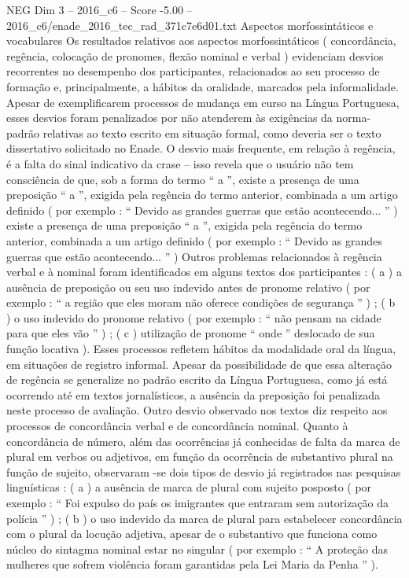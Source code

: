 \begin{textsample}{NEG Dim 3 – 2016\_c6 – Score -5.00 – 2016\_c6/enade\_2016\_tec\_rad\_371c7e6d01.txt}
Aspectos morfossintáticos e vocabulares Os resultados relativos aos aspectos morfossintáticos ( concordância, regência, colocação de pronomes, flexão nominal e verbal ) evidenciam desvios recorrentes no desempenho dos participantes, relacionados ao seu processo de formação e, principalmente, a hábitos da oralidade, marcados pela informalidade.
Apesar de exemplificarem processos de mudança em curso na Língua Portuguesa, esses desvios foram penalizados por não atenderem às exigências da norma-padrão relativas ao texto escrito em situação formal, como deveria ser o texto dissertativo solicitado no Enade.
O desvio mais frequente, em relação à regência, é a falta do sinal indicativo da crase – isso revela que o usuário não tem consciência de que, sob a forma do termo “ a ”, existe a presença de uma preposição “ a ”, exigida pela regência do termo anterior, combinada a um artigo definido ( por exemplo : “ Devido as grandes guerras que estão acontecendo... ” ) existe a presença de uma preposição “ a ”, exigida pela regência do termo anterior, combinada a um artigo definido ( por exemplo : “ Devido as grandes guerras que estão acontecendo... ” ) Outros problemas relacionados à regência verbal e à nominal foram identificados em alguns textos dos participantes : ( a ) a ausência de preposição ou seu uso indevido antes de pronome relativo ( por exemplo : “ a região que eles moram não oferece condições de segurança ” ) ; ( b ) o uso indevido do pronome relativo ( por exemplo : “ não pensam na cidade para que eles vão ” ) ; ( c ) utilização de pronome “ onde ” deslocado de sua função locativa ).
Esses processos refletem hábitos da modalidade oral da língua, em situações de registro informal.
Apesar da possibilidade de que essa alteração de regência se generalize no padrão escrito da Língua Portuguesa, como já está ocorrendo até em textos jornalísticos, a ausência da preposição foi penalizada neste processo de avaliação.
Outro desvio observado nos textos diz respeito aos processos de concordância verbal e de concordância nominal.
Quanto à concordância de número, além das ocorrências já conhecidas de falta da marca de plural em verbos ou adjetivos, em função da ocorrência de substantivo plural na função de sujeito, observaram -se dois tipos de desvio já registrados nas pesquisas linguísticas : ( a ) a ausência de marca de plural com sujeito posposto ( por exemplo : “ Foi expulso do país os imigrantes que entraram sem autorização da polícia ” ) ; ( b ) o uso indevido da marca de plural para estabelecer concordância com o plural da locução adjetiva, apesar de o substantivo que funciona como núcleo do sintagma nominal estar no singular ( por exemplo : “ A proteção das mulheres que sofrem violência foram garantidas pela Lei Maria da Penha ” ).

\end{textsample}
